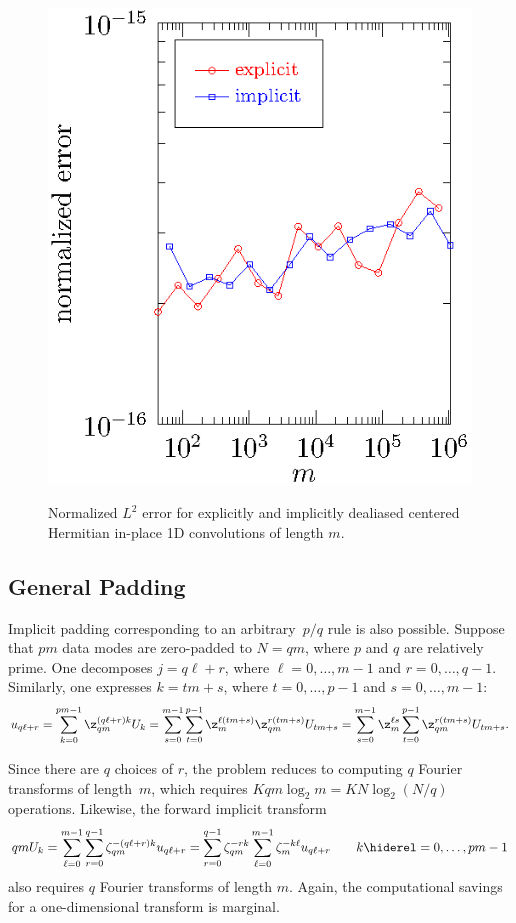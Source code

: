 \documentclass[final]{siamltex}
\def\no{\hiderel}
\begin{document}
\begin{figure}[htbp]
\begin{center}
\includegraphics{error1r}
\caption{Normalized $L^2$ error for explicitly and implicitly
dealiased centered Hermitian in-place 1D convolutions of length $m$.}
\label{error1r}
\end{center}
\end{figure}

\subsection{General Padding}\label{pq}
Implicit padding corresponding to an arbitrary~$p/q$ rule is also
possible. Suppose that $pm$ data modes are zero-padded to $N=qm$, where $p$
and $q$ are relatively prime. One decomposes $j=q\ell+r$, where
$\ell=0,\dots,m-1$ and $r=0,\dots,q-1$.
Similarly, one expresses $k=t m+s$, where $t=0,\dots,p-1$ and $s=0,\dots, m-1$:
$$
u_{q\ell+r}=\sum_{k=0}^{pm-1}\z_{qm}^{(q\ell+r)k} U_k
=\sum_{s=0}^{m-1}\sum_{t=0}^{p-1} \z_m^{\ell (t m+s)}\z_{qm}^{r(t m+s)}
U_{t m+s}
=\sum_{s=0}^{m-1}\z_m^{\ell s}\sum_{t=0}^{p-1}\z_{qm}^{r(t m+s)} U_{t m+s}.
$$

Since there are $q$ choices of $r$, the problem reduces
to computing $q$ Fourier transforms of length~$m$, which requires
$K q m\log_2 m=K N\log_2 (N/q)$ operations. 
Likewise, the forward implicit transform
$$
{qm}U_k
=\sum_{\ell=0}^{m-1}\sum_{r=0}^{q-1} \zeta_{qm}^{-(q\ell+r)k} u_{q\ell+r}
=\sum_{r=0}^{q-1}\zeta_{qm}^{-rk}\sum_{\ell=0}^{m-1}\zeta_m^{-k\ell} u_{q\ell+r}
\qquad k\no =0,\ldots,pm-1
$$
also requires $q$ Fourier transforms of length $m$. Again, the computational
savings for a one-dimensional transform is marginal.
\end{document}

